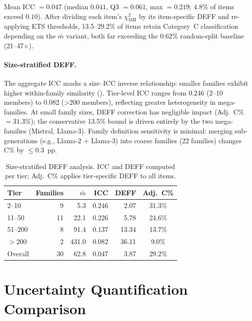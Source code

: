 \noindent Mean ICC $= 0.047$ (median $0.041$, Q3 $= 0.061$, max $= 0.219$; 4.8\% of items exceed $0.10$). After dividing each item's $\chi^2_{\mathrm{MH}}$ by its item-specific DEFF and re-applying ETS thresholds, 13.5--29.2\% of items retain Category~C classification depending on the $\bar{m}$ variant, both far exceeding the 0.62\% random-split baseline (21--47$\times$).

\paragraph{Size-stratified DEFF.} The aggregate ICC masks a size--ICC inverse relationship: smaller families exhibit higher within-family similarity (). Tier-level ICC ranges from 0.246 (2--10 members) to 0.082 ({>}200 members), reflecting greater heterogeneity in mega-families. At small family sizes, DEFF correction has negligible impact (Adj.\ C\% $= 31.3\%$); the conservative 13.5\% bound is driven entirely by the two mega-families (Mistral, Llama-3). Family definition sensitivity is minimal: merging sub-generations (e.g., Llama-2 + Llama-3) into coarse families (22 families) changes C\% by $\leq$0.3~pp.

\begin{table}[h]
\centering
\caption{Size-stratified DEFF analysis. ICC and DEFF computed per tier; Adj.\ C\% applies tier-specific DEFF to all items.}
\label{tab:deff_stratified}
\small
\begin{tabular}{lrrrrc}
\toprule
Tier & Families & $\bar{m}$ & ICC & DEFF & Adj.\ C\% \\
\midrule
2--10 & 9 & 5.3 & 0.246 & 2.07 & 31.3\% \\
11--50 & 11 & 22.1 & 0.226 & 5.78 & 24.6\% \\
51--200 & 8 & 91.4 & 0.137 & 13.34 & 13.7\% \\
${>}200$ & 2 & 431.0 & 0.082 & 36.11 & 9.0\% \\
\midrule
Overall & 30 & 62.8 & 0.047 & 3.87 & 29.2\% \\
\bottomrule
\end{tabular}
\end{table}

\section{Uncertainty Quantification Comparison}
\label{app:uncertainty}

